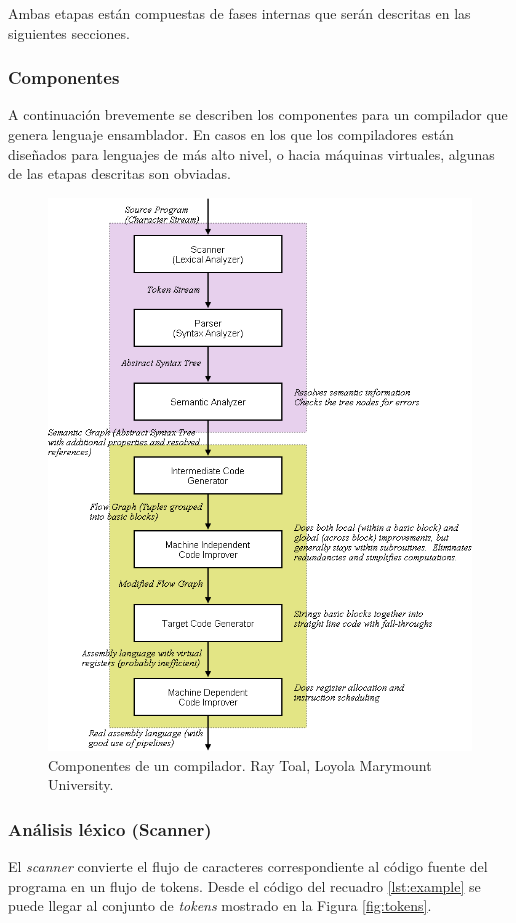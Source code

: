 Ambas etapas están compuestas de fases internas que serán descritas en las siguientes secciones.

\subsubsection{Componentes}
A continuación brevemente se describen los componentes para un compilador que genera lenguaje ensamblador. En casos en los que los compiladores están diseñados para lenguajes de más alto nivel, o hacia máquinas virtuales, algunas de las etapas descritas son obviadas.

\begin{figure}[ht]
    \centering
    \includegraphics[scale=0.3]{images/compilerphases.png}
    \caption{Componentes de un compilador. Ray Toal, Loyola Marymount University.}
    \label{fig:compiler phases}
\end{figure}


\subsubsection{Análisis léxico (Scanner)}
El \textit{scanner} convierte el flujo de caracteres correspondiente al código fuente del programa en un flujo de tokens.
Desde el código del recuadro \ref{lst:example} se puede llegar al conjunto de \textit{tokens} mostrado en la Figura \ref{fig:tokens}.\\

